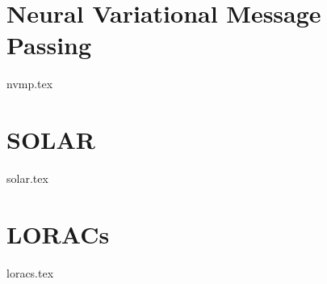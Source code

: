 \chapter{Neural Variational Message Passing}
\label{chap:nvmp}
{nvmp.tex}

\chapter{SOLAR}
\label{chap:solar}
{solar.tex}

\chapter{LORACs}
\label{chap:loracs}
{loracs.tex}
